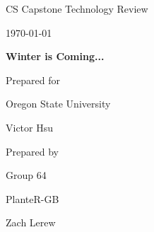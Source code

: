 \documentclass[onecolumn, draftclsnofoot,10pt, compsoc]{IEEEtran}
\def \CapstoneTeamName{			              			 PlanteR-GB}
\def \CapstoneTeamNumber{					           			 Group 64}
\def \GroupMemberOne{				           				Austin Hodgin}
\def \GroupMemberTwo{				           				Travis Hodgin}
\def \GroupMemberThree{			            Maximillian Schmidt}
\def \GroupMemberFour{		        	             Zach Lerew}
\def \CapstoneProjectName{	      	    Winter is Coming...}
\def \CapstoneSponsorCompany{		    Oregon State University}
\def \CapstoneSponsorPerson{		 			  				 Victor Hsu}
\def \DocType{		%
				Technology Review
				}
\newcommand{\NameSigPair}[1]{\par
\makebox[2.75in][r]{#1} \hfil 	\makebox[3.25in]{\makebox[2.25in]{\hrulefill} \hfill		\makebox[.75in]{\hrulefill}}
\par\vspace{-12pt} \textit{\tiny\noindent
\makebox[2.75in]{} \hfil		\makebox[3.25in]{\makebox[2.25in][r]{Signature} \hfill	\makebox[.75in][r]{Date}}}}
\renewcommand{\NameSigPair}[1]{#1}
\begin{document}
\begin{titlepage}
    \begin{singlespace}
        \hfill


        \par\vspace{.2in}
        \centering
        \scshape{
            \huge CS Capstone \DocType \par
            {\large\today}\par
            \vspace{.5in}
            \textbf{\Huge\CapstoneProjectName}\par

						\vspace{1in}

            {\large Prepared for}\par
            \Huge \CapstoneSponsorCompany\par
            \vspace{5pt}
            {\Large\NameSigPair{\CapstoneSponsorPerson}\par}

						\vspace{1in}

            {\large Prepared by}\par
						{\huge \CapstoneTeamNumber}\par
            \CapstoneTeamName\par
            \vspace{5pt}

            {
							\Large
							\NameSigPair{\GroupMemberFour}\par
            }

            \vspace{20pt}
        }

				\newpage
        \begin{abstract}
				\noindent The Control Service is a crucial piece of this system. It receives incoming data from client interfaces, processes and stores it, and then sends it to the LED control system.
				This system will have multiple clients, and possibly multiple LED controllers. The singular path between those two groups is the Control Service, making it a bottleneck of the system.
				The technology used for the inlet, processing, and outlet of the Control Service will determine the overall throughput of the system.
				This document will compare three technologies for the processing of client input, the internal representation of data, and the storage of system parameters for persistence.
        \end{abstract}
    \end{singlespace}
\end{titlepage}
\end{document}
